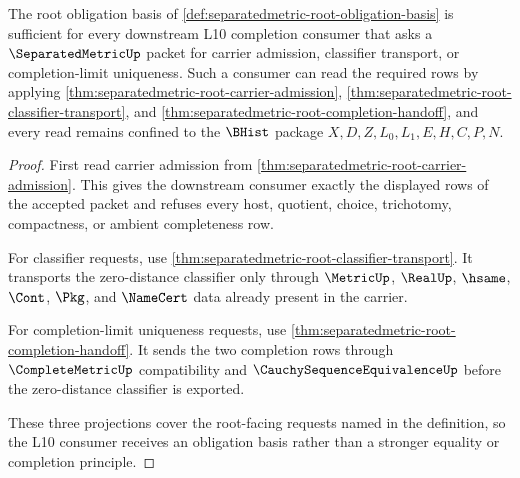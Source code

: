 \begin{theorem}
\label{thm:separatedmetric-root-obligation-basis}
The root obligation basis of \autoref{def:separatedmetric-root-obligation-basis} is sufficient for every downstream L10 completion consumer that asks a $\SeparatedMetricUp$ packet for carrier admission, classifier transport, or completion-limit uniqueness. Such a consumer can read the required rows by applying \autoref{thm:separatedmetric-root-carrier-admission}, \autoref{thm:separatedmetric-root-classifier-transport}, and \autoref{thm:separatedmetric-root-completion-handoff}, and every read remains confined to the $\BHist$ package $X,D,Z,L_0,L_1,E,H,C,P,N$.
\end{theorem}
\begin{proof}
First read carrier admission from \autoref{thm:separatedmetric-root-carrier-admission}. This gives the downstream consumer exactly the displayed rows of the accepted packet and refuses every host, quotient, choice, trichotomy, compactness, or ambient completeness row.

For classifier requests, use \autoref{thm:separatedmetric-root-classifier-transport}. It transports the zero-distance classifier only through $\MetricUp$, $\RealUp$, $\hsame$, $\Cont$, $\Pkg$, and $\NameCert$ data already present in the carrier.

For completion-limit uniqueness requests, use \autoref{thm:separatedmetric-root-completion-handoff}. It sends the two completion rows through $\CompleteMetricUp$ compatibility and $\CauchySequenceEquivalenceUp$ before the zero-distance classifier is exported.

These three projections cover the root-facing requests named in the definition, so the L10 consumer receives an obligation basis rather than a stronger equality or completion principle.
\end{proof}
